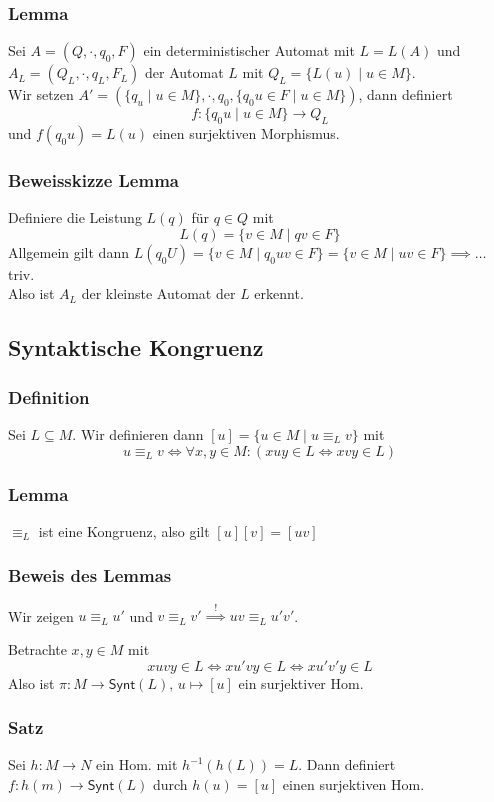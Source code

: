 \documentclass[12pt, german]{article}
\newcommand{\inv}{^{-1}}
\newcommand{\synt}{\mathsf{Synt}}
\begin{document}
	\subsubsection{Lemma}
	Sei $A = (Q, \cdot, q_0, F)$ ein deterministischer Automat mit $L = L(A)$ und $A_L = (Q_L, \cdot, q_L, F_L)$ der Automat $L$ mit $Q_L = \{L(u) \mid u \in M\}$.  \\
	
	Wir setzen $A' = (\{q_u \mid u \in M\}, \cdot, q_0, \{q_0u \in F \mid u \in M\})$, dann definiert $$f: \{q_0u \mid u \in M\} \to Q_L$$ und $f(q_0u) = L(u)$ einen surjektiven Morphismus.
	
	\subsubsection{Beweisskizze Lemma}
	Definiere die Leistung $L(q)$ für $q \in Q$ mit $$L(q) = \{v \in M \mid qv \in F\}$$ Allgemein gilt dann $L(q_0U) = \{v \in M \mid q_0uv \in F\} = \{v \in M \mid uv \in F\} \implies \ldots$ triv. \\
	Also ist $A_L$ der kleinste Automat der $L$ erkennt.
	
	\subsection{Syntaktische Kongruenz}
	\subsubsection{Definition}
	Sei $L \subseteq M$. Wir definieren dann $[u] = \{u \in M \mid u \equiv_L v\}$ mit $$ u \equiv_L v \iff \forall x,y \in M : (xuy \in L \iff xvy \in L)$$
	
	\subsubsection{Lemma}
	$\equiv_L$ ist eine Kongruenz, also gilt $[u][v]=[uv]$ 
	
	\subsubsection{Beweis des Lemmas}
	Wir zeigen $u \equiv_L u'$ und $v \equiv_L v' \overset{!}{\implies} uv \equiv_L u'v'$. 
	
	Betrachte $x,y \in M$ mit $$xuvy \in L \iff xu'vy \in L \iff xu'v'y \in L$$ Also ist $\pi: M \to \synt(L), \, u \mapsto [u]$ ein surjektiver Hom. 
	
	\subsubsection{Satz}
	Sei $h: M \to N$ ein Hom. mit $h\inv(h(L)) = L$. Dann definiert $f:h(m) \to \synt(L)$ durch $h(u) = [u]$ einen surjektiven Hom. 
	
\end{document}

